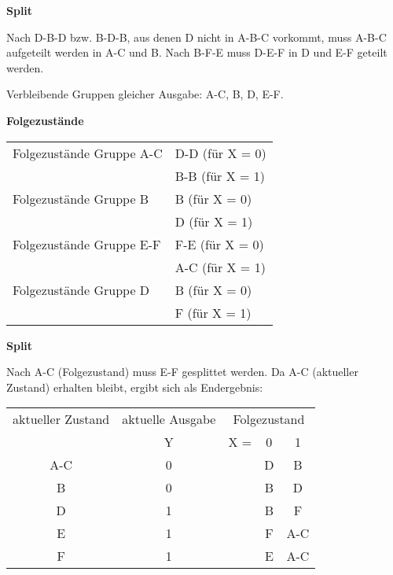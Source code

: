 \documentclass{CInf_practice}
\begin{document}
\bigskip\textbf{Split}

Nach D-B-D bzw. B-D-B, aus denen D nicht in A-B-C vorkommt, muss A-B-C aufgeteilt werden in A-C und B. Nach B-F-E muss D-E-F in D und E-F geteilt werden.

Verbleibende Gruppen gleicher Ausgabe: A-C, B, D, E-F.

\bigskip\textbf{Folgezustände}

\begin{tabular}{ll}
Folgezustände Gruppe A-C   & D-D (für X = 0) \\
                           & B-B (für X = 1) \\
Folgezustände Gruppe B     & B   (für X = 0) \\
                           & D   (für X = 1) \\
Folgezustände Gruppe E-F   & F-E (für X = 0) \\
                           & A-C (für X = 1) \\
Folgezustände Gruppe D     & B   (für X = 0) \\
                           & F   (für X = 1) \\
\end{tabular}

\bigskip\textbf{Split}

Nach A-C (Folgezustand) muss E-F gesplittet werden. Da A-C (aktueller Zustand) erhalten bleibt, ergibt sich als Endergebnis:

\begin{tabular}{c|c|ccc}
\hline
aktueller Zustand & aktuelle Ausgabe & \multicolumn{3}{c}{Folgezustand} \\
                  & Y                & X = & 0 & 1 \\ \hline
             A-C  & 0                &     & D & B \\
               B  & 0                &     & B & D \\
               D  & 1                &     & B & F \\
               E  & 1                &     & F & A-C \\
               F  & 1                &     & E & A-C \\
\end{tabular}


\def\cell#1{\multicolumn{1}{|c|}{\begin{tabular}{c}#1\end{tabular}}}
\newcommand{\cancel}[1]{%
    \tikz[baseline=(tocancel.base)]{
        \node[inner sep=0pt,outer sep=0pt] (tocancel) {#1};
        \draw[red,thick] (tocancel.south west) -- (tocancel.north east);
    }%
}%
\newcommand{\Xout}{\cell{\huge X}%
}
\end{document}
